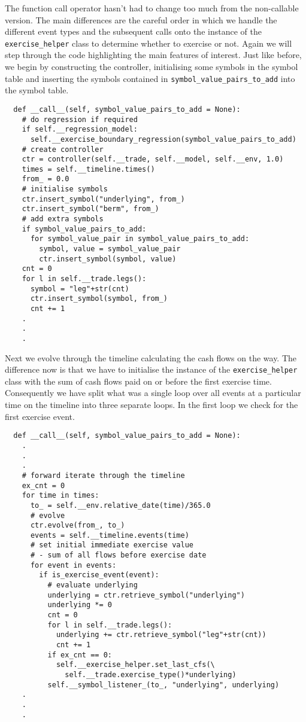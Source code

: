 The function call operator hasn't had to change too much from the
non-callable version. The main differences are the careful order in
which we handle the different event types and the subsequent calls
onto the instance of the \verb|exercise_helper| class to determine
whether to exercise or not. Again we will step through the code
highlighting the main features of interest. Just like before, we begin 
by constructing the controller, initialising some symbols in the symbol 
table and inserting the symbols contained in \verb|symbol_value_pairs_to_add| 
into the symbol table. 
\begin{verbatim}      
  def __call__(self, symbol_value_pairs_to_add = None):
    # do regression if required
    if self.__regression_model:
      self.__exercise_boundary_regression(symbol_value_pairs_to_add)
    # create controller
    ctr = controller(self.__trade, self.__model, self.__env, 1.0)
    times = self.__timeline.times()
    from_ = 0.0
    # initialise symbols
    ctr.insert_symbol("underlying", from_)
    ctr.insert_symbol("berm", from_)
    # add extra symbols
    if symbol_value_pairs_to_add:
      for symbol_value_pair in symbol_value_pairs_to_add:
        symbol, value = symbol_value_pair
        ctr.insert_symbol(symbol, value)
    cnt = 0
    for l in self.__trade.legs():
      symbol = "leg"+str(cnt)
      ctr.insert_symbol(symbol, from_)      
      cnt += 1
    .
    .
    .
\end{verbatim}
Next we evolve through the timeline calculating the cash flows on the
way. The difference now is that we have to initialise the instance of
the \verb|exercise_helper| class with the sum of cash flows paid on or
before the first exercise time. Consequently we have split what was a
single loop over all events at a particular time on the timeline into
three separate loops. In the first loop we check for the first
exercise event.
\begin{verbatim}
  def __call__(self, symbol_value_pairs_to_add = None):
    .
    .
    .
    # forward iterate through the timeline
    ex_cnt = 0
    for time in times:
      to_ = self.__env.relative_date(time)/365.0
      # evolve
      ctr.evolve(from_, to_)
      events = self.__timeline.events(time)
      # set initial immediate exercise value 
      # - sum of all flows before exercise date
      for event in events:
        if is_exercise_event(event):
          # evaluate underlying             
          underlying = ctr.retrieve_symbol("underlying")
          underlying *= 0
          cnt = 0
          for l in self.__trade.legs():
            underlying += ctr.retrieve_symbol("leg"+str(cnt))         
            cnt += 1
          if ex_cnt == 0:
            self.__exercise_helper.set_last_cfs(\
              self.__trade.exercise_type()*underlying)
          self.__symbol_listener_(to_, "underlying", underlying)
    .
    .
    .
\end{verbatim}
